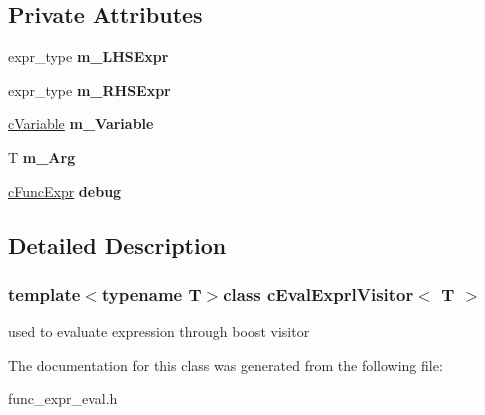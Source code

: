 \subsection*{Private Attributes}
\begin{DoxyCompactItemize}
\item 
\hypertarget{classcEvalExprlVisitor_a130c89b74eff5920c703fdaf21e388bf}{expr\-\_\-type {\bfseries m\-\_\-\-L\-H\-S\-Expr}}\label{classcEvalExprlVisitor_a130c89b74eff5920c703fdaf21e388bf}

\item 
\hypertarget{classcEvalExprlVisitor_a1f67eb84e049e5fba96f7fc1974cc758}{expr\-\_\-type {\bfseries m\-\_\-\-R\-H\-S\-Expr}}\label{classcEvalExprlVisitor_a1f67eb84e049e5fba96f7fc1974cc758}

\item 
\hypertarget{classcEvalExprlVisitor_a9fbba1b40c41299e6b9228eca82f5e04}{\hyperlink{classcVariable}{c\-Variable} {\bfseries m\-\_\-\-Variable}}\label{classcEvalExprlVisitor_a9fbba1b40c41299e6b9228eca82f5e04}

\item 
\hypertarget{classcEvalExprlVisitor_a65cd4012dc0dc24819b3255f5fd1c6bd}{T {\bfseries m\-\_\-\-Arg}}\label{classcEvalExprlVisitor_a65cd4012dc0dc24819b3255f5fd1c6bd}

\item 
\hypertarget{classcEvalExprlVisitor_a8b4ec903f0d6c4f907077671d43e946c}{\hyperlink{classcFuncExpr}{c\-Func\-Expr} {\bfseries debug}}\label{classcEvalExprlVisitor_a8b4ec903f0d6c4f907077671d43e946c}

\end{DoxyCompactItemize}


\subsection{Detailed Description}
\subsubsection*{template$<$typename T$>$class c\-Eval\-Exprl\-Visitor$<$ T $>$}

used to evaluate expression through boost visitor 

The documentation for this class was generated from the following file\-:\begin{DoxyCompactItemize}
\item 
func\-\_\-expr\-\_\-eval.\-h\end{DoxyCompactItemize}
